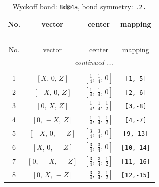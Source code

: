 \documentclass[fleqn,8pt]{jsarticle}
\begin{document}
\renewcommand{\arraystretch}{1.2}
\begin{longtable}{cccc}
\caption{Wyckoff bond: {\tt 8d@4a}, bond symmetry: {\tt .2.}}
 \\
 \hline \hline
No. & vector & center & mapping \\ \hline \endfirsthead

\multicolumn{3}{l}{\tablename\ \thetable{}} \\
 \hline \hline
No. & vector & center & mapping \\ \hline \endhead

 \hline \hline
\multicolumn{3}{r}{\footnotesize\it continued ...} \\ \endfoot

 \hline \hline
\multicolumn{3}{r}{} \\ \endlastfoot

1 & $\left[ X,\, 0,\, Z \right]$ & $\left[ \frac{1}{4},\, \frac{1}{4},\, 0 \right]$ & {\tt [1,-5]} \\ \hline
2 & $\left[ - X,\, 0,\, Z \right]$ & $\left[ \frac{1}{4},\, \frac{1}{4},\, 0 \right]$ & {\tt [2,-6]} \\ \hline
3 & $\left[ 0,\, X,\, Z \right]$ & $\left[ \frac{1}{4},\, \frac{1}{4},\, \frac{1}{2} \right]$ & {\tt [3,-8]} \\ \hline
4 & $\left[ 0,\, - X,\, Z \right]$ & $\left[ \frac{1}{4},\, \frac{1}{4},\, \frac{1}{2} \right]$ & {\tt [4,-7]} \\ \hline
5 & $\left[ - X,\, 0,\, - Z \right]$ & $\left[ \frac{3}{4},\, \frac{3}{4},\, 0 \right]$ & {\tt [9,-13]} \\ \hline
6 & $\left[ X,\, 0,\, - Z \right]$ & $\left[ \frac{3}{4},\, \frac{3}{4},\, 0 \right]$ & {\tt [10,-14]} \\ \hline
7 & $\left[ 0,\, - X,\, - Z \right]$ & $\left[ \frac{3}{4},\, \frac{3}{4},\, \frac{1}{2} \right]$ & {\tt [11,-16]} \\ \hline
8 & $\left[ 0,\, X,\, - Z \right]$ & $\left[ \frac{3}{4},\, \frac{3}{4},\, \frac{1}{2} \right]$ & {\tt [12,-15]} \\
\end{longtable}
\renewcommand{\arraystretch}{1.2}
\end{document}
